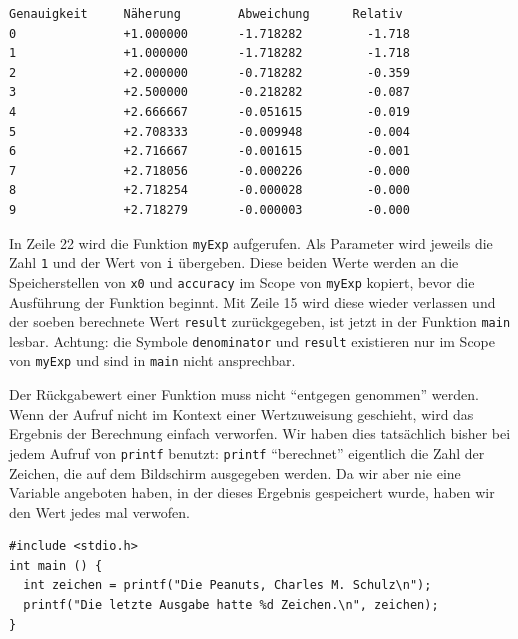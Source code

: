 \begin{cmdbox}
\begin{verbatim}
Genauigkeit     Näherung        Abweichung      Relativ
0               +1.000000       -1.718282         -1.718
1               +1.000000       -1.718282         -1.718
2               +2.000000       -0.718282         -0.359
3               +2.500000       -0.218282         -0.087
4               +2.666667       -0.051615         -0.019
5               +2.708333       -0.009948         -0.004
6               +2.716667       -0.001615         -0.001
7               +2.718056       -0.000226         -0.000
8               +2.718254       -0.000028         -0.000
9               +2.718279       -0.000003         -0.000
\end{verbatim}
\end{cmdbox}


In Zeile 22 wird die Funktion \texttt{myExp} aufgerufen. Als Parameter wird jeweils die Zahl \texttt{1} und der Wert von \texttt{i} übergeben. Diese beiden Werte werden an die Speicherstellen von \texttt{x0} und \texttt{accuracy} im Scope von \texttt{myExp} kopiert, bevor die Ausführung der Funktion beginnt. Mit Zeile 15 wird diese wieder verlassen und der soeben berechnete Wert \texttt{result} zurückgegeben, \ie ist jetzt in der Funktion \texttt{main} lesbar. Achtung: die Symbole \texttt{denominator} und \texttt{result} existieren nur im Scope von \texttt{myExp} und sind in \texttt{main} nicht ansprechbar.

Der Rückgabewert einer Funktion muss nicht \enquote{entgegen genommen} werden. Wenn der Aufruf nicht im Kontext einer Wertzuweisung geschieht, wird das Ergebnis der Berechnung einfach verworfen. Wir haben dies tatsächlich bisher bei jedem Aufruf von \texttt{printf} benutzt: \texttt{printf} \enquote{berechnet} eigentlich die Zahl der Zeichen, die auf dem Bildschirm ausgegeben werden. Da wir aber nie eine Variable angeboten haben, in der dieses Ergebnis gespeichert wurde, haben wir den Wert jedes mal verwofen.

\begin{codebox}
\begin{verbatim}
#include <stdio.h>
int main () {
  int zeichen = printf("Die Peanuts, Charles M. Schulz\n");
  printf("Die letzte Ausgabe hatte %d Zeichen.\n", zeichen);
}
\end{verbatim}
\end{codebox}

